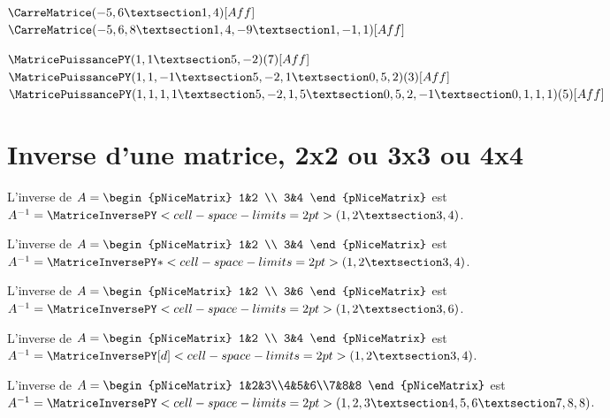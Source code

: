\documentclass[french,a4paper,10pt]{article}
\begin{document}
\begin{ShowCodeTeX}
$\CarreMatrice(-5,6 § 1,4)[Aff]$ \\
$\CarreMatrice(-5,6,8 § 1,4,-9 § 1,-1,1)[Aff]$
\end{ShowCodeTeX}

\begin{ShowCodeTeX}
$\MatricePuissancePY(1,1 § 5,-2)(7)[Aff]$\\
$\MatricePuissancePY(1,1,-1 § 5,-2,1 § 0,5,2)(3)[Aff]$ \\
$\MatricePuissancePY(1,1,1,1 § 5,-2,1,5 § 0,5,2,-1 § 0,1,1,1)(5)[Aff]$
\end{ShowCodeTeX}

\section{Inverse d'une matrice, 2x2 ou 3x3 ou 4x4}

\begin{ShowCodeTeX}
L'inverse de $A=\begin{pNiceMatrix} 1&2 \\ 3&4 \end{pNiceMatrix}$ est
$A^{-1}=\MatriceInversePY<cell-space-limits=2pt>(1,2 § 3,4)$.
\end{ShowCodeTeX}

\begin{ShowCodeTeX}
L'inverse de $A=\begin{pNiceMatrix} 1&2 \\ 3&4 \end{pNiceMatrix}$ est
$A^{-1}=\MatriceInversePY*<cell-space-limits=2pt>(1,2 § 3,4)$.
\end{ShowCodeTeX}

\begin{ShowCodeTeX}
L'inverse de $A=\begin{pNiceMatrix} 1&2 \\ 3&6 \end{pNiceMatrix}$ est
$A^{-1}=\MatriceInversePY<cell-space-limits=2pt>(1,2 § 3,6)$.
\end{ShowCodeTeX}

\begin{ShowCodeTeX}
L'inverse de $A=\begin{pNiceMatrix} 1&2 \\ 3&4 \end{pNiceMatrix}$ est
$A^{-1}=\MatriceInversePY[d]<cell-space-limits=2pt>(1,2 § 3,4)$.
\end{ShowCodeTeX}

\begin{ShowCodeTeX}
L'inverse de $A=\begin{pNiceMatrix} 1&2&3\\4&5&6\\7&8&8 \end{pNiceMatrix}$ est
$A^{-1}=\MatriceInversePY<cell-space-limits=2pt>(1,2,3 § 4,5,6 § 7,8,8)$.
\end{ShowCodeTeX}
\end{document}
